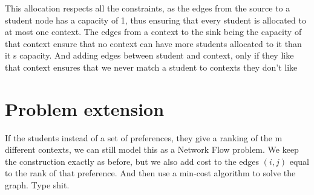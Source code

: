 \documentclass[a4paper,11pt]{article}
\begin{document}
	This allocation respects all the constraints, as the edges from the source to a student node has a capacity of 1, thus ensuring that every student is allocated to at most one context. The edges from a context to the sink being the capacity of that context ensure that no context can have more students allocated to it than it s capacity. And adding edges between student and context, only if they like that context ensures that we never match a student to contexts they don't like

	\section{Problem extension}
	If the students instead of a set of preferences, they give a ranking of the m different contexts, we can still model this as a Network Flow problem. We keep the construction exactly as before, but we also add cost to the edges $(i,j)$ equal to the rank of that preference. And then use a min-cost algorithm to solve the graph. Type shit.
\end{document}

